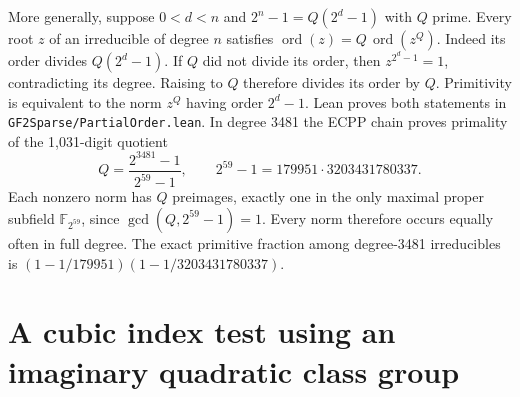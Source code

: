 \documentclass[11pt]{article}
\newcommand{\ord}{\operatorname{ord}}
\begin{document}
More generally, suppose \(0<d<n\) and \(2^n-1=Q(2^d-1)\) with \(Q\)
prime. Every root \(z\) of an irreducible of degree \(n\) satisfies
\(\ord(z)=Q\,\ord(z^Q)\). Indeed its order divides \(Q(2^d-1)\).
If \(Q\) did not divide its order, then \(z^{2^d-1}=1\), contradicting
its degree. Raising to \(Q\) therefore divides its order by \(Q\).
Primitivity is equivalent to the norm \(z^Q\) having order \(2^d-1\).
Lean proves both statements in \nolinkurl{GF2Sparse/PartialOrder.lean}.
In degree 3481 the ECPP chain proves primality of the 1,031-digit quotient
\[
      Q=\frac{2^{3481}-1}{2^{59}-1},\qquad
      2^{59}-1=179951\cdot3203431780337.
\]
Each nonzero norm has \(Q\) preimages, exactly one in the only maximal
proper subfield \(\mathbb F_{2^{59}}\), since \(\gcd(Q,2^{59}-1)=1\).
Every norm therefore occurs equally often in full degree. The exact
primitive fraction among degree-3481 irreducibles is
\((1-1/179951)(1-1/3203431780337)\).

\clearpage
\section{A cubic index test using an imaginary quadratic class group}
\label{sec:twisted-cubic-reflection}
\end{document}

